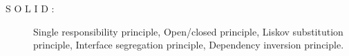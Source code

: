 \begin{description}
    \item[S O L I D : ]Single responsibility principle, Open/closed principle, Liskov substitution principle, Interface segregation principle, Dependency inversion principle.
\end{description}